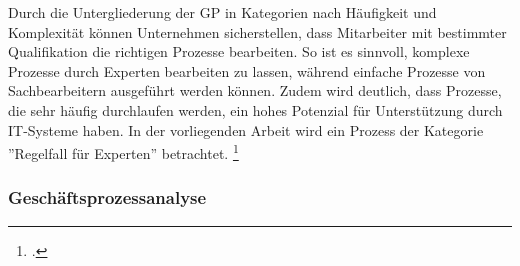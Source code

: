 Durch die Untergliederung der GP in Kategorien nach Häufigkeit und Komplexität können Unternehmen sicherstellen, dass Mitarbeiter mit bestimmter Qualifikation die richtigen Prozesse bearbeiten. So ist es sinnvoll, komplexe Prozesse durch Experten bearbeiten zu lassen, während einfache Prozesse von Sachbearbeitern ausgeführt werden können. Zudem wird deutlich, dass Prozesse, die sehr häufig durchlaufen werden, ein hohes Potenzial für Unterstützung durch IT-Systeme haben. In der vorliegenden Arbeit wird ein Prozess der Kategorie ''Regelfall für Experten'' betrachtet. \footcite[Vgl.][S. 42]{theorie_gadatsch_grundkurs_geschäftsprozessmanagement_2010} 

\subsubsection{Geschäftsprozessanalyse}

